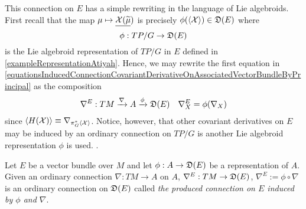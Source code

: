 \begin{example}
This connection on $E$ has a simple rewriting in the language of Lie algebroids. First recall that the map $\mu \mapsto \underline{\mathcal{X} (\widetilde{\mu}})$ is precisely $\phi(\cl{\ppal X}) \in \alg D(E)$ where 
\begin{equation}
    \phi: TP/G \to \alg D(E)
\end{equation} 
is the Lie algebroid representation of $TP/G$ in $E$ defined in \ref{exampleRepresentationAtiyah}. Hence, we may rewrite the first equation in \eqref{equationsInducedConnectionCovariantDerivativeOnAssociatedVectorBundleByPrincipal} as the composition
\begin{align}
    \nabla^E : TM \xrightarrow{\nabla} A \xrightarrow{\phi} \alg D(E) && \nabla_X^E = \phi(\nabla_X)
\end{align}
since $\left\langle H(\mathcal{X}) \right\rangle \equiv \nabla_{\pi^*_G\left\langle \mathcal{X} \right\rangle}$. Notice, however, that other covariant derivatives on $E$ may be induced by an ordinary connection on $TP/G$ is another Lie algebroid representation $\phi$ is used. .
\end{example}

\begin{definition}
Let $E$ be a vector bundle over $M$ and let $\phi: A \to \alg D(E)$ be a representation of $A$. Given an ordinary connection $\nabla: TM \to A$ on $A$, $\nabla^E: TM \to \mathfrak{D}(E)$, $\nabla^E := \phi \circ \nabla$ is an ordinary connection on $\mathfrak{D}(E)$ called \emph{the produced connection on $E$ induced by $\phi$ and $\nabla$}.
\end{definition}

